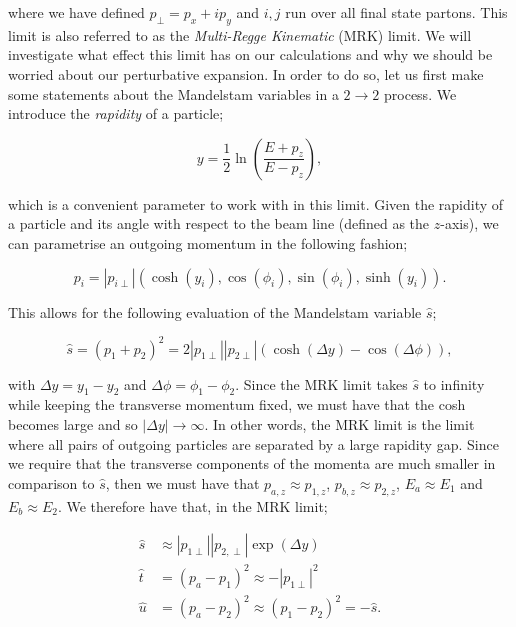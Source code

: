 where we have defined $p_{\perp} = p_x + i p_y$ and $i,j$ run over all final state partons. This limit is also referred to as the \emph{Multi-Regge Kinematic} (MRK) limit. We will investigate what effect this limit has on our calculations and why we should be worried about our perturbative expansion. In order to do so, let us first make some statements about the Mandelstam variables in a $2 \to 2$ process. We introduce the \emph{rapidity} of a particle;

\begin{equation}
y = \frac{1}{2} \ln \left( \frac{E + p_z}{E - p_z} \right),
\end{equation}

which is a convenient parameter to work with in this limit. Given the rapidity of a particle and its angle with respect to the beam line (defined as the $z$-axis), we can parametrise an outgoing momentum in the following fashion;

\begin{equation}
p_i = |p_{i \perp}| (\cosh(y_i), \cos(\phi_i), \sin(\phi_i), \sinh(y_i)).
\end{equation}

This allows for the following evaluation of the Mandelstam variable $\hat{s}$;

\begin{equation}
\hat{s} = (p_1 + p_2)^2 = 2 |p_{1 \perp}| |p_{2 \perp}| \left(\cosh(\Delta y) - \cos(\Delta \phi)\right),
\end{equation}

with $\Delta y = y_1 - y_2$ and $\Delta \phi = \phi_1 - \phi_2$. Since the MRK limit takes $\hat{s}$ to infinity while keeping the transverse momentum fixed, we must have that the cosh becomes large and so $|\Delta y| \to \infty$. In other words, the MRK limit is the limit where all pairs of outgoing particles are separated by a large rapidity gap. Since we require that the transverse components of the momenta are much smaller in comparison to $\hat{s}$, then we must have that $p_{a,z} \approx p_{1,z}$, $p_{b,z} \approx p_{2,z}$, $E_a \approx E_1$ and $E_b \approx E_2$. We therefore have that, in the MRK limit;

\begin{subequations}
\begin{align}
\hat{s} &\approx |p_{1 \perp}| |p_{2, \perp}| \exp(\Delta y) \\
\hat{t}  &= (p_a - p_1)^2 \approx  -|p_{1 \perp}|^2 \\
\hat{u} &= (p_a - p_2)^2 \approx (p_1 - p_2)^2 = -\hat{s}.
\end{align}
\end{subequations}

